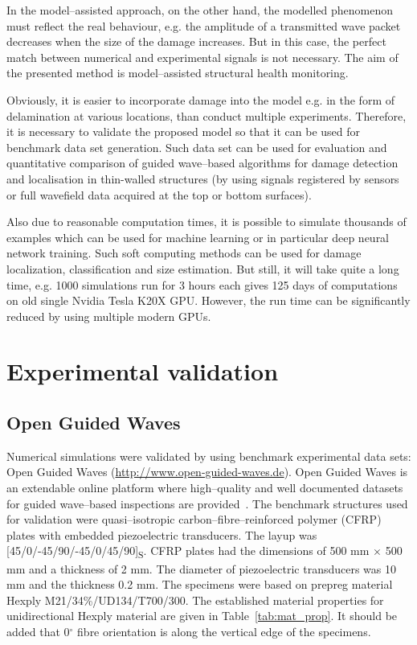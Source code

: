 \documentclass[preprint,12pt]{elsarticle}
\begin{document}
	In the model--assisted approach, on the other hand, the modelled phenomenon must reflect the real behaviour, e.g. the amplitude of a transmitted wave packet decreases when the size of the damage increases. But in this case, the perfect match between numerical and experimental signals is not necessary. The aim of the presented method is model--assisted structural health monitoring.
	
	Obviously, it is easier to incorporate damage into the model e.g. in the form of delamination at various locations, than conduct multiple experiments. Therefore, it is necessary to validate the proposed model so that it can be used for benchmark data set generation. Such data set can be used for evaluation and quantitative comparison of guided wave--based algorithms for damage detection and localisation in thin-walled structures (by using signals registered by sensors or full wavefield data acquired at the top or bottom surfaces).
	
	Also due to reasonable computation times, it is possible to simulate thousands of examples which can be used for machine learning or in particular deep neural network training. Such soft computing methods can be used for damage localization, classification and size estimation. But still, it will take quite a long time, e.g. 1000 simulations run for 3 hours each gives 125 days of computations on old single Nvidia Tesla K20X GPU. However, the run time can be significantly reduced by using multiple modern GPUs.
	
	\section{Experimental validation}
	\subsection{Open Guided Waves \label{sec:ogw}}
	Numerical simulations were validated by using benchmark experimental data sets: Open Guided Waves (\url{http://www.open-guided-waves.de}). Open Guided Waves is an extendable online platform where high--quality and well documented datasets for guided wave--based inspections are provided~\cite{Moll2018}. The benchmark structures used for validation were quasi--isotropic carbon--fibre--reinforced polymer (CFRP) plates with embedded piezoelectric transducers. The layup was [45/0/-45/90/-45/0/45/90]\textsubscript{S}. CFRP plates had the dimensions of 500 mm $\times$ 500 mm and a thickness of 2 mm. The diameter of piezoelectric transducers was 10 mm and the thickness 0.2 mm. The specimens were based on prepreg material Hexply\textsuperscript{\textregistered} M21/34\%/UD134/T700/300. The established material properties for unidirectional Hexply material are given in Table~\ref{tab:mat_prop}. It should be added that 0$^{\circ}$ fibre orientation is along the vertical edge of the specimens.
	
\end{document}
